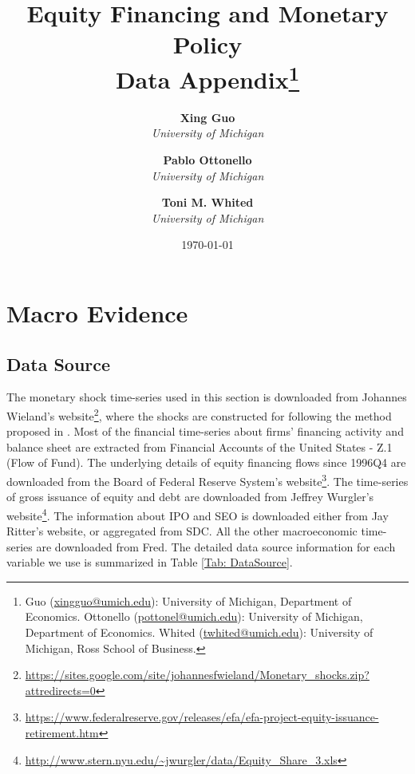 \documentclass[11pt]{article}
\begin{document}
\title{ \LARGE \textbf{Equity Financing and Monetary Policy\\ Data Appendix}\thanks{Guo (\href{xingguo@umich.edu}{xingguo@umich.edu}): University of Michigan, Department of Economics. Ottonello (\href{pottonel@umich.edu}{pottonel@umich.edu}): University of Michigan, Department of Economics. Whited (\href{twhited@umich.edu}{twhited@umich.edu}): University of Michigan, Ross School of Business.} } 



\author{\textbf{Xing Guo}\\ \textit{University of Michigan}   \and \textbf{Pablo Ottonello}\\ \textit{University of Michigan} \and \textbf{Toni M. Whited} \\ \textit{University of Michigan} }

\date{\today}
\maketitle

\section{Macro Evidence}
\subsection{Data Source}
The monetary shock time-series used in this section is downloaded from Johannes Wieland's website\footnote{\url{https://sites.google.com/site/johannesfwieland/Monetary_shocks.zip?attredirects=0}}, where the shocks are constructed for \cite{WielandYang:NBER:2016} following the method proposed in \cite{RomerRomer:AER:2004}. Most of the financial time-series about firms' financing activity and balance sheet are extracted from Financial Accounts of the United States - Z.1 (Flow of Fund). The underlying details of equity financing flows since 1996Q4 are downloaded from the Board of Federal Reserve System's website\footnote{\url{https://www.federalreserve.gov/releases/efa/efa-project-equity-issuance-retirement.htm}}. The time-series of gross issuance of equity and debt are downloaded from Jeffrey Wurgler's website\footnote{\url{http://www.stern.nyu.edu/~jwurgler/data/Equity_Share_3.xls}}. The information about IPO and SEO is downloaded either from Jay Ritter's website, or aggregated from SDC. All the other macroeconomic time-series are downloaded from Fred. The detailed data source information for each variable we use is summarized in Table \ref{Tab: DataSource}.
\end{document}
